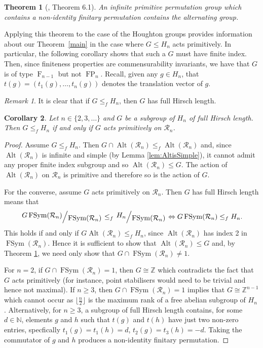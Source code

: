 \documentclass[11pt,a4paper]{amsart}
\newtheorem{theorem}{Theorem}[section]
\newtheorem{corollary}[theorem]{Corollary}
\theoremstyle{definition}
\theoremstyle{remark}
\newtheorem*{remark*}{Remark}
\newcommand{\FSym}{\operatorname{FSym}}
\newcommand{\Alt}{\operatorname{Alt}}
\newcommand{\Z}{\mathbb Z}
\newcommand{\N}{\mathbb N}
\newcommand{\Ra}{\mathcal{R}}
\newcommand{\quotient}[2]{{\left.\raisebox{.2em}{$#1$}\middle/\raisebox{-.2em}{$#2$}\right.}}
\newcommand{\FFF}{\operatorname{F}}
\newcommand{\FP}{\operatorname{FP}}
\begin{document}
\begin{theorem}[\cite{CameronPG}, Theorem 6.1]\label{cameron}
	An infinite primitive permutation group which contains a non-identity finitary permutation contains the alternating group.
\end{theorem}
Applying this theorem to the case of the Houghton groups provides information about our Theorem~\ref{main} in the case where $G\le H_n$ acts primitively. In particular, the following corollary shows that such a $G$ must have finite index. Then, since finiteness properties are commensurability invariants, we have that $G$ is of type $\FFF_{n-1}$ but not $\FP_n$. Recall, given any $g\in H_n$, that $t(g)=(t_1(g), \ldots, t_n(g))$ denotes the translation vector of $g$.

\begin{remark*} It is clear that if $G\le_fH_n$, then $G$ has full Hirsch length.
\end{remark*}
\begin{corollary}\label{cameron2} Let $n\in \{2, 3, \ldots\}$ and $G$ be a subgroup of $H_n$ of full Hirsch length. Then $G\le_f H_n$  if and only if $G$ acts primitively on $\Ra_n$.
\end{corollary}
\begin{proof} Assume $G\le_fH_n$. Then $G\cap \Alt(\Ra_n)\le_f \Alt(\Ra_n)$ and, since $\Alt(\Ra_n)$ is infinite and simple (by Lemma \ref{lem:AltisSimple}), it cannot admit any proper finite index subgroup and so $\Alt(\Ra_n)\le G$. The action of $\Alt(\Ra_n)$ on $\Ra_n$ is primitive and therefore so is the action of $G$.
	
	For the converse, assume $G$ acts primitively on $\Ra_n$. Then $G$ has full Hirsch length means that
	$$\quotient{G\FSym(\Ra_n)}{\FSym(\Ra_n)}\le_f\quotient{H_n}{\FSym(\Ra_n)}
	\Leftrightarrow G\FSym(\Ra_n)\le_fH_n.
	$$
	This holds if and only if $G\Alt(\Ra_n)\le_fH_n$, since $\Alt(\Ra_n)$ has index 2 in $\FSym(\Ra_n)$. Hence it is sufficient to show that $\Alt(\Ra_n)\le G$ and, by Theorem \ref{cameron}, we need only show that $G\cap \FSym(\Ra_n)\ne 1$. 
	
	For $n=2$, if $G\cap \FSym(\Ra_n)=1$, then $G\cong \Z$ which contradicts the fact that $G$ acts primitively (for instance, point stabilisers would need to be trivial and hence not maximal). If $n\ge 3$, then $G\cap \FSym(\Ra_n)=1$ implies that $G\cong \Z^{n-1}$ which cannot occur as $\lfloor \frac{n}{2}\rfloor$ is the maximum rank of a free abelian subgroup of $H_n$ \cite[Theorem 3.4]{Simon}. Alternatively, for $n\ge 3$, a subgroup of full Hirsch length contains, for some $d\in \N$, elements $g$ and $h$ such that $t(g)$ and $t(h)$ have just two non-zero entries, specfically $t_1(g)=t_1(h)=d$, $t_2(g)=t_3(h)=-d$. Taking the commutator of $g$ and $h$ produces a non-identity finitary permutation.
\end{proof}
\end{document}
